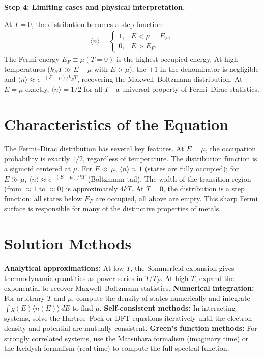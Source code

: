 \textbf{Step 4: Limiting cases and physical interpretation.}

At $T = 0$, the distribution becomes a step function:
\begin{align}
\langle n \rangle = \begin{cases} 1, & E < \mu = E_F, \\ 0, & E > E_F. \end{cases}
\end{align}
The Fermi energy $E_F \equiv \mu(T=0)$ is the highest occupied energy. At high temperatures ($k_BT \gg E - \mu$ with $E > \mu$), the $+1$ in the denominator is negligible and $\langle n \rangle \approx e^{-(E-\mu)/k_BT}$, recovering the Maxwell--Boltzmann distribution. At $E = \mu$ exactly, $\langle n \rangle = 1/2$ for all $T$---a universal property of Fermi--Dirac statistics.

\section*{Characteristics of the Equation}

The Fermi--Dirac distribution has several key features. At $E = \mu$, the occupation probability is exactly $1/2$, regardless of temperature. The distribution function is a sigmoid centered at $\mu$. For $E \ll \mu$, $\langle n \rangle \approx 1$ (states are fully occupied); for $E \gg \mu$, $\langle n \rangle \approx e^{-(E-\mu)/kT}$ (Boltzmann tail). The width of the transition region (from $\approx 1$ to $\approx 0$) is approximately $4kT$. At $T = 0$, the distribution is a step function: all states below $E_F$ are occupied, all above are empty. This sharp Fermi surface is responsible for many of the distinctive properties of metals.
\section*{Solution Methods}

\textbf{Analytical approximations:} At low $T$, the Sommerfeld expansion gives thermodynamic quantities as power series in $T/T_F$. At high $T$, expand the exponential to recover Maxwell--Boltzmann statistics. \textbf{Numerical integration:} For arbitrary $T$ and $\mu$, compute the density of states numerically and integrate $\int g(E)\langle n(E)\rangle\,dE$ to find $\mu$. \textbf{Self-consistent methods:} In interacting systems, solve the Hartree--Fock or DFT equations iteratively until the electron density and potential are mutually consistent. \textbf{Green's function methods:} For strongly correlated systems, use the Matsubara formalism (imaginary time) or the Keldysh formalism (real time) to compute the full spectral function.
